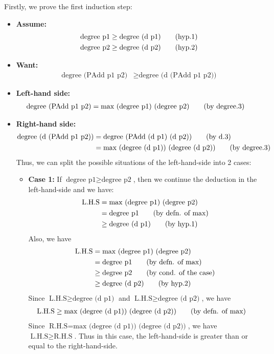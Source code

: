 \documentclass[11pt]{article}
\theoremstyle{definition}
\begin{document}
\begin{enumerate}
\begin{enumerate}[(a)]
Firstly, we prove the first induction step:
\begin{itemize}
\item \textbf{Assume:}
\begin{align*}
\text{degree p1} &\geq \text{degree (d p1)} \tag{\text{hyp.1}} \\
\text{degree p2} &\geq \text{degree (d p2)} \tag{\text{hyp.2}}
\end{align*}
\item \textbf{Want:}
\begin{align*}
\text{degree (PAdd p1 p2)} &\geq \text{degree (d (PAdd p1 p2))}
\end{align*}
\item \textbf{Left-hand side:}
\begin{align*}
\text{degree (PAdd p1 p2)} &= \text{max (degree p1) (degree p2)} \tag{\text{by degree.3}}
\end{align*}
\item \textbf{Right-hand side:}
\begin{align*}
\text{degree (d (PAdd p1 p2))} &= \text{degree (PAdd (d p1) (d p2))} \tag{\text{by d.3}} \\
							   &= \text{max (degree (d p1)) (degree (d p2))} \tag{\text{by degree.3}}
\end{align*}
Thus, we can split the possible situations of the left-hand-side into 2 cases:
\begin{itemize}
\item \textbf{Case 1: }If $\text{degree p1} \geq \text{degree p2}$, then we continue the deduction in the left-hand-side 
and we have:
\begin{align*}
\text{L.H.S} &= \text{max (degree p1) (degree p2)} \\
			 &= \text{degree p1} \tag{\text{by defn. of max}} \\
			 &\geq \text{degree (d p1)} \tag{\text{by hyp.1}}
\end{align*} 
Also, we have
\begin{align*}
\text{L.H.S} &= \text{max (degree p1) (degree p2)} \\
			 &= \text{degree p1} \tag{\text{by defn. of max}} \\
			 &\geq \text{degree p2} \tag{\text{by cond. of the case}} \\
			 &\geq \text{degree (d p2)} \tag{\text{by hyp.2}}
\end{align*}
Since $\text{L.H.S} \geq \text{degree (d p1)}$ and $\text{L.H.S} \geq \text{degree (d p2)}$, we have
\begin{align*}
\text{L.H.S} &\geq \text{max (degree (d p1)) (degree (d p2))} \tag{\text{by defn. of max}}
\end{align*}
Since $\text{R.H.S} = \text{max (degree (d p1)) (degree (d p2))}$, we have $\text{L.H.S} \geq \text{R.H.S}$. Thus in this case, the left-hand-side is greater than or equal to the right-hand-side.


\end{itemize}
\end{itemize}
\end{enumerate}
\end{enumerate}
\end{document}
